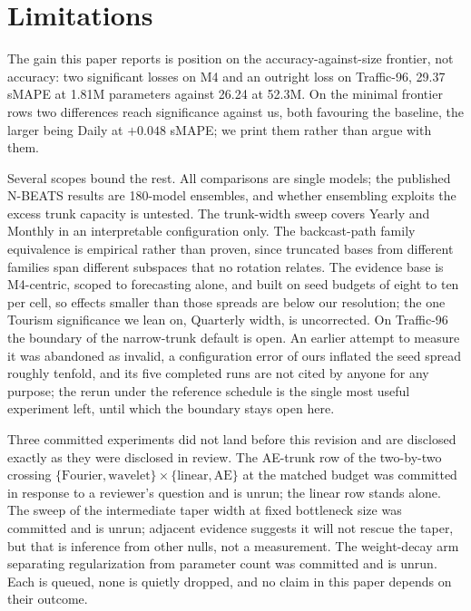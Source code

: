%
%

\section{Limitations}
\label{sec:limitations}

The gain this paper reports is position on the accuracy-against-size
frontier, not accuracy: two significant losses on M4 and an outright
loss on Traffic-96, 29.37 sMAPE at 1.81M parameters against 26.24 at
52.3M. On the minimal frontier rows two differences reach significance
against us, both favouring the baseline, the larger being Daily at
$+0.048$ sMAPE; we print them rather than argue with them.

Several scopes bound the rest. All comparisons are single models; the
published N-BEATS results are 180-model ensembles, and whether
ensembling exploits the excess trunk capacity is untested. The
trunk-width sweep covers Yearly and Monthly in an interpretable
configuration only. The backcast-path family equivalence is empirical
rather than proven, since truncated bases from different families span
different subspaces that no rotation relates. The evidence base is
M4-centric, scoped to forecasting alone, and built on seed budgets of
eight to ten per cell, so effects smaller than those spreads are below
our resolution; the one Tourism significance we lean on, Quarterly width,
is uncorrected. On Traffic-96 the boundary of the narrow-trunk default
is open. An earlier attempt to measure it was abandoned as invalid, a
configuration error of ours inflated the seed spread roughly tenfold,
and its five completed runs are not cited by anyone for any purpose;
the rerun under the reference schedule is the single most useful
experiment left, until which the boundary stays open here.

Three committed experiments did not land before this revision and are
disclosed exactly as they were disclosed in review. The AE-trunk row of
the two-by-two crossing $\{\text{Fourier}, \text{wavelet}\} \times
\{\text{linear}, \text{AE}\}$ at the matched budget was committed in
response to a reviewer's question and is unrun; the linear row stands
alone. The sweep of the intermediate taper width at fixed bottleneck
size was committed and is unrun; adjacent evidence suggests it will not
rescue the taper, but that is inference from other nulls, not a
measurement. The weight-decay arm separating regularization from
parameter count was committed and is unrun. Each is queued, none is
quietly dropped, and no claim in this paper depends on their outcome.

